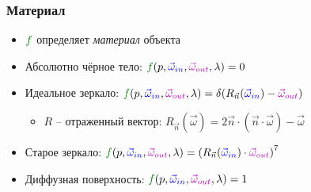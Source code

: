 \documentclass[10pt]{beamer}
\begin{document}
\begin{frame}[fragile]
\begin{center}
\end{center}
\end{frame}

\begin{frame}[fragile]
\frametitle{Материал}
\begin{itemize}
\item \begin{math}{\color{green}f}\end{math} определяет \textit{материал} объекта
\pause 
\item Абсолютно чёрное тело: \begin{math}{\color{green}f}(p, {\color{blue}\vec\omega_{in}}, {\color{magenta}\vec\omega_{out}}, \lambda) = 0\end{math}
\pause
\item Идеальное зеркало: \begin{math}{\color{green}f}(p, {\color{blue}\vec\omega_{in}}, {\color{magenta}\vec\omega_{out}}, \lambda) = \delta({R_{\vec n}(\color{blue}\vec\omega_{in}}) - {\color{magenta}\vec\omega_{out}})\end{math}
\begin{itemize}
\item \begin{math}R\end{math} -- отраженный вектор: \begin{math}R_{\vec n}(\vec \omega) = 2\vec n \cdot (\vec n \cdot \vec \omega) - \vec \omega\end{math}
\end{itemize}
\pause
\item Старое зеркало: \begin{math}{\color{green}f}(p, {\color{blue}\vec\omega_{in}}, {\color{magenta}\vec\omega_{out}}, \lambda) = \left(R_{\vec n}({\color{blue}\vec\omega_{in}})\cdot{\color{magenta}\vec\omega_{out}}\right)^7\end{math}
\pause
\item Диффузная поверхность: \begin{math}{\color{green}f}(p, {\color{blue}\vec\omega_{in}}, {\color{magenta}\vec\omega_{out}}, \lambda) = 1\end{math}
\end{itemize}
\end{frame}
\end{document}
